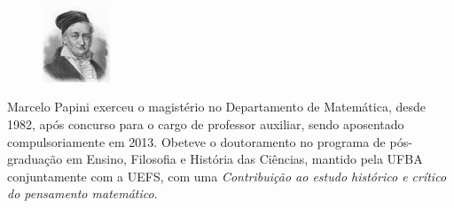 \documentclass{hipatia}
\begin{document}
\vspace{1cm}
\begin{figure}
	\vspace{-10pt}
	\centering
	\includegraphics[width=2cm]{Carl-Friedrich-Gauss-engraving.jpg}
\end{figure}\noindent
Marcelo Papini 
exerceu o magistério no Departamento de Matemática, desde 1982,  após concurso para o cargo de professor auxiliar, sendo aposentado compulsoriamente em 2013. Obeteve o doutoramento no programa de pós-graduação em Ensino, Filosofia e História das Ciências, mantido pela UFBA conjuntamente com a UEFS, com uma \emph{Contribuição ao estudo histórico e crítico do pensamento matemático}.
\end{document}
